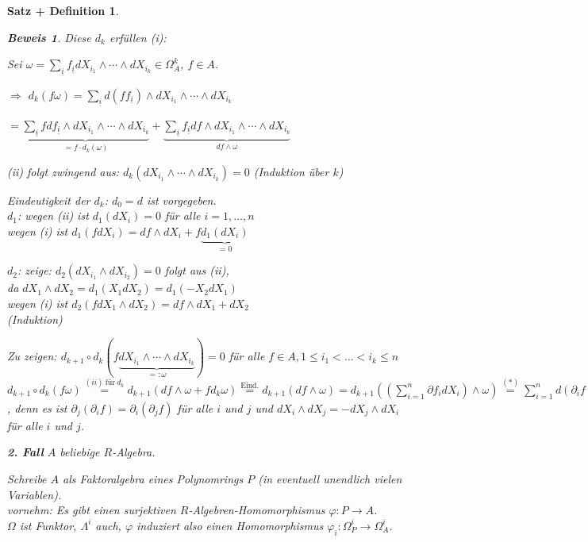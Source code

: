 \documentclass[a4paper,12pt]{scrbook}
\theoremstyle{break}
\newtheorem{SatzDef}[Satz]{Satz + Definition}
\theoremstyle{nonumberbreak}
\newtheorem{Bew}{Beweis}
\theoremstyle{nonumberplain}
\newcommand{\defeql}[0]{=\mathrel{\mathop:}}
\begin{document}
\begin{SatzDef}
\begin{Bew}
Diese $d_k$ erfüllen (i):

Sei $\omega = \sum_{\underline{i}} f_{\underline{i}} dX_{i_1} \wedge \cdots \wedge dX_{i_k} \in \Omega^k_A$, $f \in A$.

$\Rightarrow$ $d_k(f \omega) = \sum_{\underline{i}} d(f f_{\underline{i}}) \wedge dX_{i_1} \wedge \cdots \wedge dX_{i_k}$

$= \underbrace{ \sum_{\underline{i}} f df_{\underline{i}} \wedge dX_{i_1} \wedge \cdots \wedge dX_{i_k} }_{= f \cdot d_k(\omega)} + \underbrace{ \sum_{\underline{i}} f_{\underline{i}} df \wedge dX_{i_1} \wedge \cdots \wedge dX_{i_k} }_{d f \wedge \omega}$

(ii) folgt zwingend aus: $d_k(dX_{i_1}\wedge \cdots \wedge dX_{i_k}) = 0$ (Induktion über $k$)

Eindeutigkeit der $d_k$: $d_0=d$ ist vorgegeben.\\
$d_1$: wegen (ii) ist $d_1(dX_i)=0$ für alle $i=1, \ldots, n$\\
wegen (i) ist $d_1(fdX_i)=df\wedge dX_i+f\underbrace{d_1(dX_i)}_{=0}$

$d_2$: zeige: $d_2(dX_{i_1}\wedge dX_{i_2})=0$ folgt aus (ii),\\
da $dX_1\wedge dX_2=d_1(X_1 dX_2)=d_1(-X_2dX_1)$\\
wegen (i) ist $d_2(fdX_1\wedge dX_2)=df\wedge dX_1+dX_2$\\
(Induktion)

Zu zeigen: $d_{k+1}\circ d_k(f\underbrace{dX_{i_1}\wedge \cdots \wedge dX_{i_k}}_{\defeql \omega})=0$ für alle $f\in A, 1\leq i_1<\dots<i_k\leq n$\\
$d_{k+1}\circ d_k(f\omega)
\stackrel{(ii)\ \textrm{für}\ d_k}{=}d_{k+1}(df\wedge \omega +fd_k\omega)
\stackrel{\textrm{Eind.}}{=}d_{k+1}(df\wedge \omega) 
=d_{k+1}\left(\left(\sum_{i=1}^{n}\partial f_i dX_i\right)\wedge \omega\right)
\stackrel{(*)}{=}\sum_{i=1}^{n}d(\partial_if\wedge dX_i\wedge \omega)
=\sum_{i=1}^n \sum_{j=1}^n \partial_j (\partial_i f)dX_j\wedge dX_{i}\wedge \omega = 0$,
denn es ist $\partial_j(\partial_i f) = \partial_i(\partial_j f)$ für alle $i$ und $j$
und $dX_i\wedge dX_j=-dX_j\wedge dX_i$ für alle $i$ und $j$.

\textbf{2. Fall} $A$ beliebige $R$-Algebra.

Schreibe $A$ als Faktoralgebra eines Polynomrings $P$ (in eventuell unendlich vielen Variablen).\\
vornehm: Es gibt einen surjektiven $R$-Algebren-Homomorphismus $\varphi:P\to A$.\\
$\Omega$ ist Funktor, $\Lambda^i$ auch, $\varphi$ induziert also einen Homomorphismus 
$\varphi_i: \Omega_P^{i}\to \Omega_A^{i}$.


\end{Bew}
\end{SatzDef}
\end{document}
